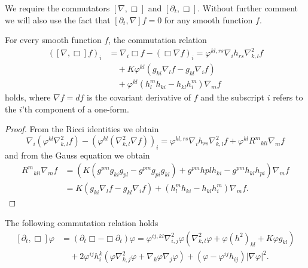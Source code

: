 \documentclass{amsart}
\begin{document}
We require the commutators \([\nabla, \Box]\) and \([\partial_t, \Box]\). Without further comment we will also use the fact that \([\partial_t, \nabla] f = 0\) for any smooth function \(f\).

\begin{lemma}
\label{lem:gradBox}
For every smooth function $f$, the commutation relation
\[
\begin{split}
([\nabla, \Box]f)_i &= \nabla_i \Box f - (\Box \nabla f)_i = \varphi^{kl,rs} \nabla_i h_{rs} \nabla^2_{k,l} f \\
&\quad + K \varphi^{kl} \left(g_{ki} \nabla_l f - g_{kl} \nabla_i f\right) \\
&\quad + \varphi^{kl}\left(h^{m}_{l}h_{ki} - h_{kl}h^{m}_{i}\right) \nabla_m f
\end{split}
\]
holds, where \(\nabla f = df\) is the covariant derivative of \(f\) and the subscript \(i\) refers to the \(i\)'th component of a one-form.
\end{lemma}

\begin{proof}
From the Ricci identities we obtain
\[
\nabla_i (\varphi^{kl} \nabla^2_{k,l} f) - (\varphi^{kl}(\nabla^2_{k,l} \nabla f))_i = \varphi^{kl,rs} \nabla_i h_{rs} \nabla^2_{k,l}f + \varphi^{kl}{R^{m}}_{kli} \nabla_m f
\]
and from the Gauss equation we obtain
\[
\begin{split}
{R^{m}}_{kli} \nabla_m f &= \left(K\left(g^{pm}g_{ki}g_{pl}  - g^{pm}g_{pi}g_{kl}\right) + g^{pm} h{pl}h_{ki} - g^{pm}h_{kl}h_{pi}\right) \nabla_m f \\
&= K\left(g_{ki} \nabla_l f - g_{kl} \nabla_i f\right) + \left(h^{m}_{l}h_{ki} - h_{kl}h^{m}_{i}\right) \nabla_m f.
\end{split}
\]
\end{proof}

\begin{lemma}
\label{lem:deltBox}
The following commutation relation holds
\[
\begin{split}
[\partial_t, \Box] \varphi &= (\partial_{t}\Box - \Box\partial_{t}) \varphi = \varphi^{ij,kl} \nabla^2_{i,j} \varphi (\nabla^2_{k,l} \varphi + \varphi (h^2)_{kl} + K \varphi g_{kl}) \\
&\quad + 2\varphi^{ij}h^{k}_{i} (\varphi \nabla^2_{k,j} \varphi + \nabla_k \varphi \nabla_j \varphi) + (\varphi - \varphi^{ij}h_{ij})| \nabla\varphi|^{2}.
\end{split}
\]
\end{lemma}
\end{document}
